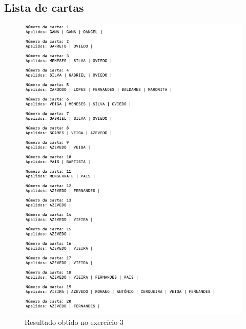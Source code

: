 \documentclass[11pt,a4paper]{report}
\begin{document}
\subsection{Lista de cartas}
\begin{figure}[h]
\includegraphics[scale=0.50]{ex3}
\caption{Resultado obtido no exercício 3}
\end{figure}

\newpage 
\end{document}
